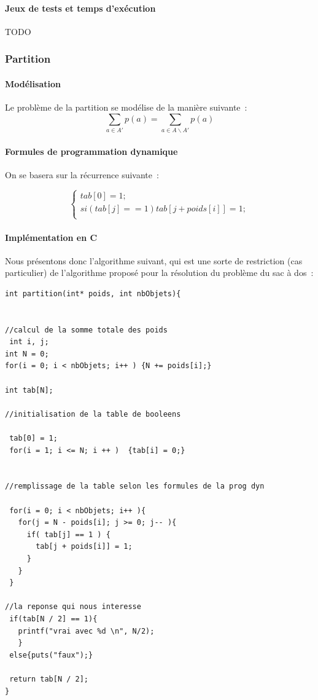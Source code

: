 \documentclass[a4paper, 12pt]{article}
\begin{document}
\paragraph{Jeux de tests et temps d'exécution}

TODO

\subsubsection{Partition}

\paragraph{Modélisation}

Le problème de la partition se modélise de la manière suivante~:
\begin{equation}
\sum_{a \in A'} p(a)= \sum_{a \in A
    \backslash A'}p(a)
\end{equation}

\paragraph{Formules de programmation dynamique}

On se basera sur la récurrence suivante~:

\begin{equation}
\begin{cases}
tab[0] = 1; \\
si ( tab[j] == 1 ) {
       tab[j + poids[i]] = 1;
     } \\
\end{cases}
\end{equation}

\paragraph{Implémentation en C}

Nous présentons donc l'algorithme suivant, qui est une sorte de
restriction (cas particulier) de l'algorithme proposé pour la
résolution du problème du sac à dos~:

\begin{lstlisting}
int partition(int* poids, int nbObjets){ 


//calcul de la somme totale des poids
 int i, j;
int N = 0;
for(i = 0; i < nbObjets; i++ ) {N += poids[i];}

int tab[N]; 

//initialisation de la table de booleens

 tab[0] = 1;
 for(i = 1; i <= N; i ++ )  {tab[i] = 0;}


//remplissage de la table selon les formules de la prog dyn

 for(i = 0; i < nbObjets; i++ ){
   for(j = N - poids[i]; j >= 0; j-- ){
     if( tab[j] == 1 ) {
       tab[j + poids[i]] = 1;
     }
   }
 }

//la reponse qui nous interesse
 if(tab[N / 2] == 1){ 
   printf("vrai avec %d \n", N/2);
   }
 else{puts("faux");}

 return tab[N / 2];
}

\end{lstlisting}
\end{document}
